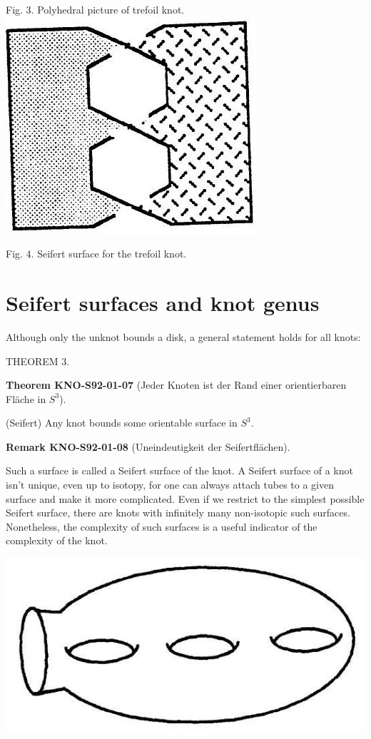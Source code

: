 \documentclass[10pt, letterpaper]{article}
\newcommand{\CustomHeading}[3]{%
  \par\medskip\noindent%
  \textbf{#1 #2} \textnormal{(#3)}.\enskip%
}
\newenvironment{THEO}[2]{\begin{unitbox}\CustomHeading{Theorem}{#1}{#2}}{\end{unitbox}}
\newenvironment{REM}[2]{\begin{unitbox}\CustomHeading{Remark}{#1}{#2}}{\end{unitbox}}
\begin{document}
Fig. 3. Polyhedral picture of trefoil knot.\\
\includegraphics[scale=0.2, center]{2025_05_21_037de704f595ce642d3eg-078}

Fig. 4. Seifert surface for the trefoil knot.




\section{Seifert surfaces and knot genus}

Although only the unknot bounds a disk, a general statement holds for all knots:

THEOREM 3. 

\begin{THEO}{KNO-S92-01-07}{Jeder Knoten ist der Rand einer orientierbaren Fläche in $S^3$}
(Seifert) Any knot bounds some orientable surface in $S^{3}$.
\end{THEO}

\begin{REM}{KNO-S92-01-08}{Uneindeutigkeit der Seifertflächen}
Such a surface is called a Seifert surface of the knot. A Seifert surface of a knot isn't unique, even up to isotopy, for one can always attach tubes to a given surface and make it more complicated. Even if we restrict to the simplest possible Seifert surface, there are knots with infinitely many non-isotopic such surfaces. Nonetheless, the complexity of such surfaces is a useful indicator of the complexity of the knot.
\end{REM}


\includegraphics[scale=0.2, center]{2025_05_21_037de704f595ce642d3eg-079}
\end{document}
